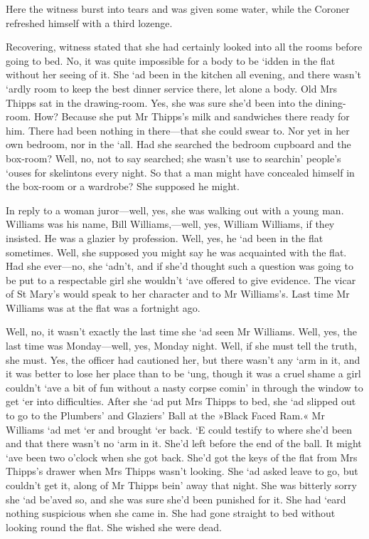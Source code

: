 Here the witness burst into tears and was given some water, while the Coroner refreshed himself with a third lozenge.

Recovering, witness stated that she had certainly looked into all the rooms before going to bed. No, it was quite impossible for a body to be `idden in the flat without her seeing of it. She `ad been in the kitchen all evening, and there wasn't `ardly room to keep the best dinner service there, let alone a body. Old Mrs Thipps sat in the drawing-room. Yes, she was sure she'd been into the dining-room. How? Because she put Mr Thipps's milk and sandwiches there ready for him. There had been nothing in there—that she could swear to. Nor yet in her own bedroom, nor in the `all. Had she searched the bedroom cupboard and the box-room? Well, no, not to say searched; she wasn't use to searchin' people's `ouses for skelintons every night. So that a man might have concealed himself in the box-room or a wardrobe? She supposed he might.

In reply to a woman juror—well, yes, she was walking out with a young man. Williams was his name, Bill Williams,---well, yes, William Williams, if they insisted. He was a glazier by profession. Well, yes, he `ad been in the flat sometimes. Well, she supposed you might say he was acquainted with the flat. Had she ever—no, she `adn't, and if she'd thought such a question was going to be put to a respectable girl she wouldn't `ave offered to give evidence. The vicar of St Mary's would speak to her character and to Mr Williams's. Last time Mr Williams was at the flat was a fortnight ago.

Well, no, it wasn't exactly the last time she `ad seen Mr Williams. Well, yes, the last time was Monday—well, yes, Monday night. Well, if she must tell the truth, she must. Yes, the officer had cautioned her, but there wasn't any `arm in it, and it was better to lose her place than to be `ung, though it was a cruel shame a girl couldn't `ave a bit of fun without a nasty corpse comin' in through the window to get `er into difficulties. After she `ad put Mrs Thipps to bed, she `ad slipped out to go to the Plumbers' and Glaziers' Ball at the »Black Faced Ram.« Mr Williams `ad met `er and brought `er back. `E could testify to where she'd been and that there wasn't no `arm in it. She'd left before the end of the ball. It might `ave been two o'clock when she got back. She'd got the keys of the flat from Mrs Thipps's drawer when Mrs Thipps wasn't looking. She `ad asked leave to go, but couldn't get it, along of Mr Thipps bein' away that night. She was bitterly sorry she `ad be'aved so, and she was sure she'd been punished for it. She had `eard nothing suspicious when she came in. She had gone straight to bed without looking round the flat. She wished she were dead.

